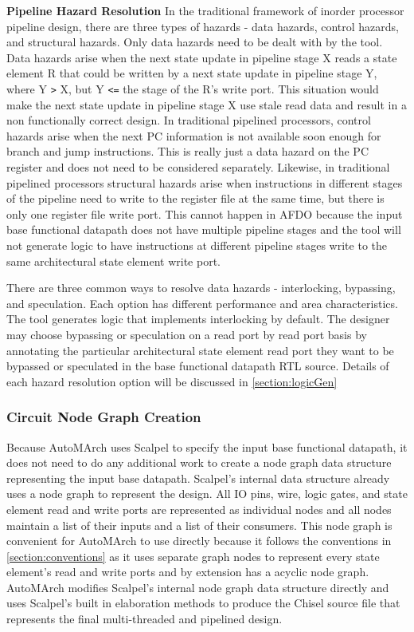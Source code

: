 {\bf Pipeline Hazard Resolution}
In the traditional framework of inorder processor pipeline design, there are three types of hazards - data hazards, control hazards, and structural hazards. Only data hazards need to be dealt with by the tool. Data hazards arise when the next state update in pipeline stage X reads a state element R that could be written by a next state update in pipeline stage Y, where Y {\tt >} X, but Y {\tt <=} the stage of the R's write port. This situation would make the next state update in pipeline stage X use stale read data and result in a non functionally correct design. In traditional pipelined processors, control hazards arise when the next PC information is not available soon enough for branch and jump instructions. This is really just a data hazard on the PC register and does not need to be considered separately. Likewise, in traditional pipelined processors structural hazards arise when instructions in different stages of the pipeline need to write to the register file at the same time, but there is only one register file write port. This cannot happen in AFDO because the input base functional datapath does not have multiple pipeline stages and the tool will not generate logic to have instructions at different pipeline stages write to the same architectural state element write port.

There are three common ways to resolve data hazards - interlocking, bypassing, and speculation. Each option has different performance and area characteristics. The tool generates logic that implements interlocking by default. The designer may choose bypassing or speculation on a read port by read port basis by annotating the particular architectural state element read port they want to be bypassed or speculated in the base functional datapath RTL source. Details of each hazard resolution option will be discussed in \ref{section:logicGen}

\subsubsection{Circuit Node Graph Creation}
\label{section:graphCreation}
Because AutoMArch uses Scalpel to specify the input base functional datapath, it does not need to do any additional work to create a node graph data structure representing the input base datapath. Scalpel's internal data structure already uses a node graph to represent the design. All IO pins, wire, logic gates, and state element read and write ports are represented as individual nodes and all nodes maintain a list of their inputs and a list of their consumers. This node graph is convenient for AutoMArch to use directly because it follows the conventions in \ref{section:conventions} as it uses separate graph nodes to represent every state element's read and write ports and by extension has a acyclic node graph. AutoMArch modifies Scalpel's internal node graph data structure directly and uses Scalpel's built in elaboration methods to produce the Chisel source file that represents the final multi-threaded and pipelined design.

